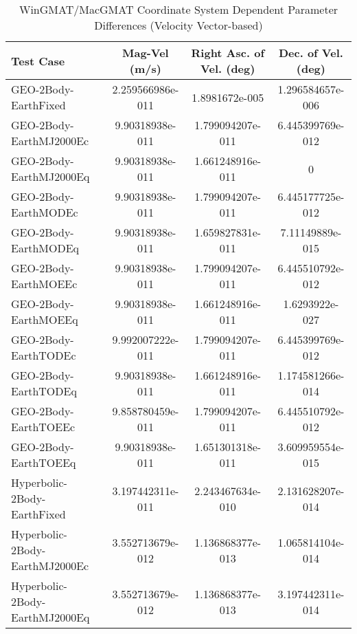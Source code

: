 \begin{table}[htbp!]
\centering
\caption{ WinGMAT/MacGMAT Coordinate System Dependent Parameter Differences (Velocity Vector-based)}
      \begin{tabular}{lccc}
      \hline\hline
          Test Case & Mag-Vel (m/s) & Right Asc. of Vel. (deg) & Dec. of Vel. (deg) \\
         \hline
         GEO-2Body-EarthFixed & 2.259566986e-011 & 1.8981672e-005 & 1.296584657e-006 \\
         GEO-2Body-EarthMJ2000Ec & 9.90318938e-011 & 1.799094207e-011 & 6.445399769e-012 \\
         GEO-2Body-EarthMJ2000Eq & 9.90318938e-011 & 1.661248916e-011 & 0 \\
         GEO-2Body-EarthMODEc & 9.90318938e-011 & 1.799094207e-011 & 6.445177725e-012 \\
         GEO-2Body-EarthMODEq & 9.90318938e-011 & 1.659827831e-011 & 7.11149889e-015 \\
         GEO-2Body-EarthMOEEc & 9.90318938e-011 & 1.799094207e-011 & 6.445510792e-012 \\
         GEO-2Body-EarthMOEEq & 9.90318938e-011 & 1.661248916e-011 & 1.6293922e-027 \\
         GEO-2Body-EarthTODEc & 9.992007222e-011 & 1.799094207e-011 & 6.445399769e-012 \\
         GEO-2Body-EarthTODEq & 9.90318938e-011 & 1.661248916e-011 & 1.174581266e-014 \\
         GEO-2Body-EarthTOEEc & 9.858780459e-011 & 1.799094207e-011 & 6.445510792e-012 \\
         GEO-2Body-EarthTOEEq & 9.90318938e-011 & 1.651301318e-011 & 3.609959554e-015 \\
         Hyperbolic-2Body-EarthFixed & 3.197442311e-011 & 2.243467634e-010 & 2.131628207e-014 \\
         Hyperbolic-2Body-EarthMJ2000Ec & 3.552713679e-012 & 1.136868377e-013 & 1.065814104e-014 \\
         Hyperbolic-2Body-EarthMJ2000Eq & 3.552713679e-012 & 1.136868377e-013 & 3.197442311e-014 \\

\end{tabular}
\end{table}
